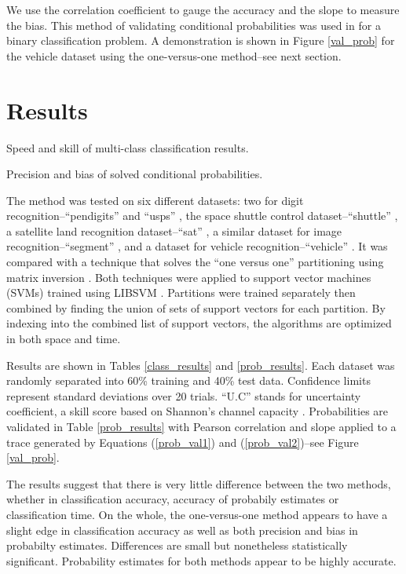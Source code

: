 We use the correlation coefficient to gauge the accuracy and the slope to
measure the bias.
This method of validating conditional probabilities was used in
\citet{Mills2009} for a binary classification problem.
A demonstration is shown in Figure \ref{val_prob}
for the vehicle dataset using the one-versus-one method--see next section.

\section{Results}

\begin{table}
\caption{Speed and skill of multi-class classification results.}\label{class_results}

\caption{Precision and bias of solved conditional probabilities.}\label{prob_results}

\end{table}

The method was tested on six different datasets:
two for digit recognition--``pendigits'' \citep{Alimoglu1996} and
``usps'' \citep{Hull1994}, the space shuttle control dataset--``shuttle''
\citep{King_etal1995}, a satellite land recognition
dataset--``sat'' \citep{King_etal1995}, 
a similar dataset for image recognition--``segment'' \citep{King_etal1995},
and a dataset for vehicle recognition--``vehicle'' \citep{Siebert1987}.
It was compared with a technique that solves the ``one versus one'' 
partitioning using matrix inversion \citep{Wu_etal2004}.
Both techniques were applied to support vector machines (SVMs) trained using
LIBSVM \citep{Chang_Lin2011}.
Partitions were trained separately then combined by finding the union of
sets of support vectors for each partition.
By indexing into the combined list of support vectors, the algorithms are
optimized in both space and time.

Results are shown in Tables \ref{class_results} and \ref{prob_results}.
Each dataset was randomly separated into 60\% training and 40\%
test data.
Confidence limits represent standard deviations over 20 trials.
``U.C'' stands for uncertainty
coefficient, a skill score based on Shannon's channel capacity
\citep{Shannon,Press_etal1992,Mills2011}.
Probabilities are validated in Table \ref{prob_results} with Pearson correlation and slope
applied to a trace generated by 
Equations (\ref{prob_val1}) and (\ref{prob_val2})--see Figure \ref{val_prob}.

The results suggest that there is very little difference between the two
methods, whether in classification accuracy, accuracy of probabily estimates
or classification time.
On the whole, the one-versus-one method appears to have a slight edge in
classification accuracy as well as both precision and bias in probabilty
estimates.
Differences are small but nonetheless statistically significant.
Probability estimates for both methods appear to be highly accurate.

